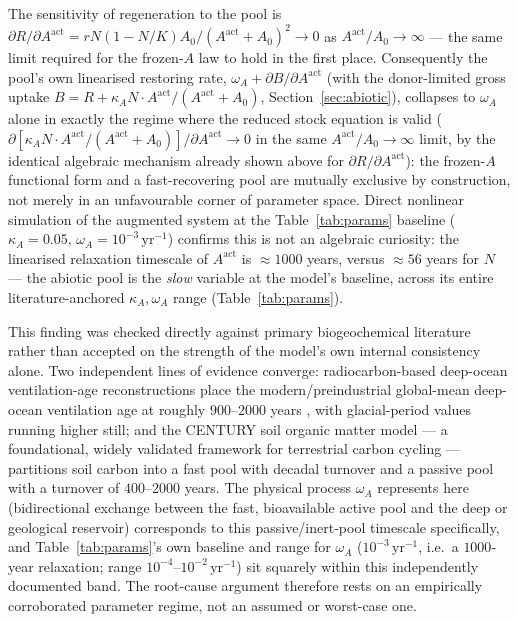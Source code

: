 \documentclass[twocolumn,10pt]{article}
\begin{document}
The sensitivity of regeneration to the pool is $\partial R/\partial A^{\text{act}} = rN(1-N/K)A_0/(A^{\text{act}}+A_0)^2 \to 0$ as $A^{\text{act}}/A_0\to\infty$ --- the same limit required for the frozen-$A$ law to hold in the first place. Consequently the pool's own linearised restoring rate, $\omega_A+\partial B/\partial A^{\text{act}}$ (with the donor-limited gross uptake $B=R+\kappa_A N\cdot A^{\text{act}}/(A^{\text{act}}+A_0)$, Section~\ref{sec:abiotic}), collapses to $\omega_A$ alone in exactly the regime where the reduced stock equation is valid ($\partial[\kappa_A N\cdot A^{\text{act}}/(A^{\text{act}}+A_0)]/\partial A^{\text{act}}\to0$ in the same $A^{\text{act}}/A_0\to\infty$ limit, by the identical algebraic mechanism already shown above for $\partial R/\partial A^{\text{act}}$): the frozen-$A$ functional form and a fast-recovering pool are mutually exclusive by construction, not merely in an unfavourable corner of parameter space. Direct nonlinear simulation of the augmented system at the Table~\ref{tab:params} baseline ($\kappa_A=0.05$, $\omega_A=10^{-3}\,\text{yr}^{-1}$) confirms this is not an algebraic curiosity: the linearised relaxation timescale of $A^{\text{act}}$ is $\approx1000$ years, versus $\approx56$ years for $N$ --- the abiotic pool is the \emph{slow} variable at the model's baseline, across its entire literature-anchored $\kappa_A,\omega_A$ range (Table~\ref{tab:params}).

This finding was checked directly against primary biogeochemical literature rather than accepted on the strength of the model's own internal consistency alone. Two independent lines of evidence converge: radiocarbon-based deep-ocean ventilation-age reconstructions place the modern/preindustrial global-mean deep-ocean ventilation age at roughly $900$--$2000$ years \cite{skinner2017}, with glacial-period values running higher still; and the CENTURY soil organic matter model --- a foundational, widely validated framework for terrestrial carbon cycling \cite{parton1987} --- partitions soil carbon into a fast pool with decadal turnover and a passive pool with a turnover of $400$--$2000$ years. The physical process $\omega_A$ represents here (bidirectional exchange between the fast, bioavailable active pool and the deep or geological reservoir) corresponds to this passive/inert-pool timescale specifically, and Table~\ref{tab:params}'s own baseline and range for $\omega_A$ ($10^{-3}\,\text{yr}^{-1}$, i.e.\ a $1000$-year relaxation; range $10^{-4}$--$10^{-2}\,\text{yr}^{-1}$) sit squarely within this independently documented band. The root-cause argument therefore rests on an empirically corroborated parameter regime, not an assumed or worst-case one.
\end{document}
